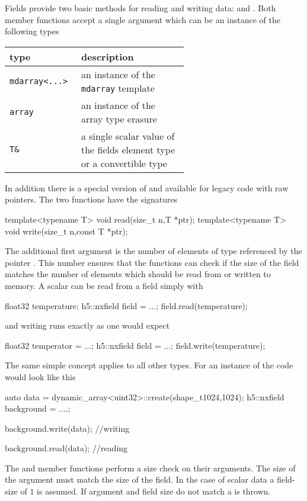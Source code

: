 Fields provide two basic methods for reading and writing data:  and
. Both member functions accept a single argument which can be an
instance of the following types
\begin{center}
    \begin{tabular}{l|p{0.6\linewidth}}
        \textbf{type} & \textbf{description} \\
        \hline
        \hline
        \texttt{mdarray<...>} & an instance of the \texttt{mdarray} template \\
        \hline
        \texttt{array} & an instance of the array type erasure \\
        \hline
        \texttt{T\& } & a single scalar value of the fields element type or a 
        convertible type \\
        \hline
    \end{tabular}
\end{center}
In addition there is a special version of  and 
available for legacy code with raw pointers. The two functions have the
signatures
\begin{cppcode}
template<typename T> void read(size_t n,T *ptr);
template<typename T> void write(size_t n,const T *ptr);
\end{cppcode}
The additional first argument  is the number of elements of type 
referenced by the pointer . This number ensures that the functions 
can check if the size of the field matches the number of elements which should
be read from or written to memory.
A scalar can be read from a field simply with
\begin{cppcode}
float32 temperature; 
h5::nxfield field = ...;
field.read(temperature);
\end{cppcode}
and writing runs exactly as one would expect
\begin{cppcode}
float32 temperator = ...;
h5::nxfield field = ...;
field.write(temperature);
\end{cppcode}
The same simple concept applies to all other types. For an instance of 
 the code would look like this
\begin{cppcode}
auto data = dynamic_array<uint32>::create(shape_t{1024,1024});
h5::nxfield background = ....;

background.write(data); //writing

background.read(data);  //reading
\end{cppcode}

The  and  member functions perform a size check on
their arguments. The size of the argument must match the size of the field. 
In the case of scalar data a field-size of $1$ is assumed. If argument and field
size do not match a  is thrown.

